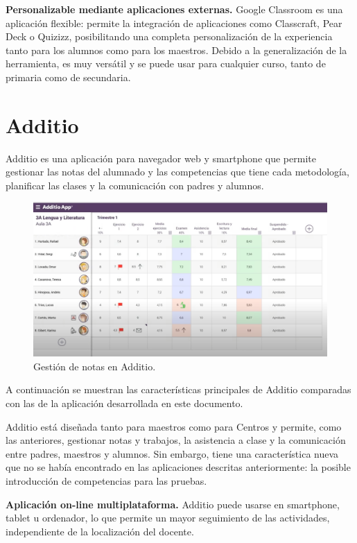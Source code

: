 \textbf {Personalizable mediante aplicaciones externas.} Google Classroom es una aplicación flexible: permite la integración de aplicaciones como Classcraft, Pear Deck o Quizizz, posibilitando una completa personalización de la experiencia tanto para los alumnos como para los maestros. Debido a la generalización de la herramienta, es muy versátil y se puede usar para cualquier curso, tanto de primaria como de secundaria.
	

\section{Additio}
\label{sec:additio}

Additio es una aplicación para navegador web y smartphone\cite{additio} que permite gestionar las notas del alumnado y las competencias que tiene cada metodología, planificar las clases y la comunicación con padres y alumnos.

\begin{figure}[h]
\centering\includegraphics[width=1\linewidth]{figs/additio.png}
\caption{Gestión de notas en Additio.\cite{additioyoutube}}
\label{Fig:additio}
\end{figure}

A continuación se muestran las características principales de Additio comparadas con las de la aplicación desarrollada en este documento.

Additio está diseñada tanto para maestros como para Centros y permite, como las anteriores, gestionar notas y trabajos, la asistencia a clase y la comunicación entre padres, maestros y alumnos. Sin embargo, tiene una característica nueva que no se había encontrado en las aplicaciones descritas anteriormente: la posible introducción de competencias para las pruebas.

\textbf {Aplicación on-line multiplataforma.} Additio puede usarse en smartphone, tablet u ordenador, lo que permite un mayor seguimiento de las actividades, independiente de la localización del docente.
 
